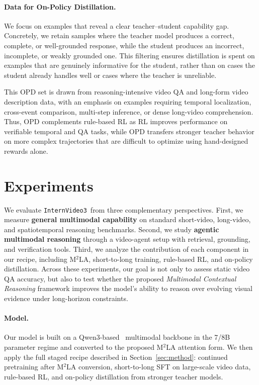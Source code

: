 \documentclass[11pt, letterpaper]{template}
\theoremstyle{plain}
\theoremstyle{definition}
\theoremstyle{remark}
\newcommand{\name}{\texttt{InternVideo3}\xspace}
\begin{document}
\paragraph{Data for On-Policy Distillation.}
We focus on examples that reveal a clear teacher--student capability gap. Concretely, we retain samples where the teacher model produces a correct, complete, or well-grounded response, while the student produces an incorrect, incomplete, or weakly grounded one. This filtering ensures distillation is spent on examples that are genuinely informative for the student, rather than on cases the student already handles well or cases where the teacher is unreliable.

This OPD set is drawn from reasoning-intensive video QA and long-form video description data, with an emphasis on examples requiring temporal localization, cross-event comparison, multi-step inference, or dense long-video comprehension. Thus, OPD complements rule-based RL as RL improves performance on verifiable temporal and QA tasks, while OPD transfers stronger teacher behavior on more complex trajectories that are difficult to optimize using hand-designed rewards alone.

\section{Experiments}
We evaluate \name\ from three complementary perspectives. First, we measure \textbf{general multimodal capability} on standard short-video, long-video, and spatiotemporal reasoning benchmarks. Second, we study \textbf{agentic multimodal reasoning} through a video-agent setup with retrieval, grounding, and verification tools. Third, we analyze the contribution of each component in our recipe, including M$^2$LA, short-to-long training, rule-based RL, and on-policy distillation. Across these experiments, our goal is not only to assess static video QA accuracy, but also to test whether the proposed \emph{Multimodal Contextual Reasoning} framework improves the model's ability to reason over evolving visual evidence under long-horizon constraints.

\paragraph{Model.}
Our model is built on a Qwen3-based~\citep{yang2025qwen3} multimodal backbone in the 7/8B parameter regime and converted to the proposed M$^2$LA attention form. We then apply the full staged recipe described in Section~\ref{sec:method}: continued pretraining after M$^2$LA conversion, short-to-long SFT on large-scale video data, rule-based RL, and on-policy distillation from stronger teacher models.
\end{document}
